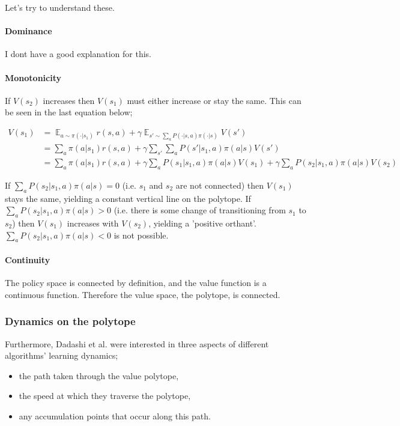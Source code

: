 Let's try to understand these.

\paragraph{Dominance} {\color{red}I dont have a good explanation for this.}

\paragraph{Monotonicity} If $V(s_2)$ increases then $V(s_1)$ must either increase or stay the same.
This can be seen in the last equation below;

\begin{align*}
V(s_1) &= \mathop{\mathbb E}_{a \sim\pi(\cdot|s_1)} r(s, a) + \gamma \mathop{\mathbb E}_{s'\sim \sum_a P(\cdot|s, a)\pi(\cdot|s)} V(s')\\
&= \sum_a \pi(a|s_1)r(s, a) + \gamma \sum_{s'}\sum_a P(s'|s_1, a)\pi(a|s) V(s') \\
&= \sum_a \pi(a|s_1)r(s, a) + \gamma \sum_a P(s_1|s_1, a)\pi(a|s) V(s_1) + \gamma\sum_a P(s_2|s_1, a)\pi(a|s) V(s_2)
\end{align*}

If $\sum_a P(s_2|s_1, a)\pi(a|s) = 0$ (i.e. $s_1$ and $s_2$ are not connected)
then $V(s_1)$ stays the same, yielding a constant vertical line on the polytope.
If $\sum_a P(s_2|s_1, a)\pi(a|s) > 0$ (i.e. there is some change of transitioning from $s_1$ to $s_2$)
then $V(s_1)$ increases with $V(s_2)$, yielding a 'positive orthant'.
$\sum_a P(s_2|s_1, a)\pi(a|s) < 0$ is not possible.

\paragraph{Continuity} The policy space is connected by definition, and the value function is a continuous function.
Therefore the value space, the polytope, is connected.

\subsubsection{Dynamics on the polytope}

Furthermore, Dadashi et al. \cite{Dadashi2018} were interested in three aspects of different algorithms’ learning dynamics;

\begin{itemize}
\tightlist
  \item the path taken through the value polytope,
  \item the speed at which they traverse the polytope,
  \item any accumulation points that occur along this path.
\end{itemize}

